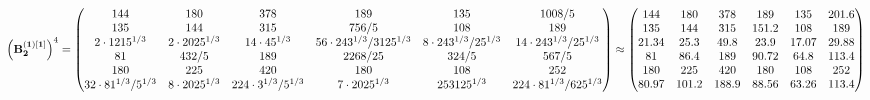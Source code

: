 \documentclass[10pt,a4paper]{article}
\begin{document}
	\[
		\left(\bold{B_2^{(1)[1]}}\right)^{4} = 
		\begin{pmatrix}
			{{144}}{} & {{180}}{} & {{378}}{} & {{189}}{} & {{135}}{} & {{1008}} / {{5}} \\
			{{135}}{} & {{144}}{} & {{315}}{} & {{756}} / {{5}} & {{108}}{} & {{189}}{} \\
			{{2} \cdot {1215^ {1 / 3}}}{} & {{2} \cdot {2025^ {1 / 3}}}{} & {{14} \cdot {45^ {1 / 3}}}{} & {{56} \cdot {243^ {1 / 3}}} / {{3125^ {1 / 3}}} & {{8} \cdot {243^ {1 / 3}}} / {{25^ {1 / 3}}} & {{14} \cdot {243^ {1 / 3}}} / {{25^ {1 / 3}}} \\
			{{81}}{} & {{432}} / {{5}} & {{189}}{} & {{2268}} / {{25}} & {{324}} / {{5}} & {{567}} / {{5}} \\
			{{180}}{} & {{225}}{} & {{420}}{} & {{180}}{} & {{108}}{} & {{252}}{} \\
			{{32} \cdot {81^ {1 / 3}}} / {{5^ {1 / 3}}} & {{8} \cdot {2025^ {1 / 3}}}{} & {{224} \cdot {3^ {1 / 3}}} / {{5^ {1 / 3}}} & {{7} \cdot {2025^ {1 / 3}}}{} & {{253125^ {1 / 3}}}{} & {{224} \cdot {81^ {1 / 3}}} / {{625^ {1 / 3}}} \\
		\end{pmatrix}
		\approx
		\begin{pmatrix}
			144      & 180      & 378      & 189      & 135      & 201.6    \\
			135      & 144      & 315      & 151.2    & 108      & 189      \\
			21.34    & 25.3     & 49.8     & 23.9     & 17.07    & 29.88    \\
			81       & 86.4     & 189      & 90.72    & 64.8     & 113.4    \\
			180      & 225      & 420      & 180      & 108      & 252      \\
			80.97    & 101.2    & 188.9    & 88.56    & 63.26    & 113.4    \\
		\end{pmatrix}
	\]
\end{document}
